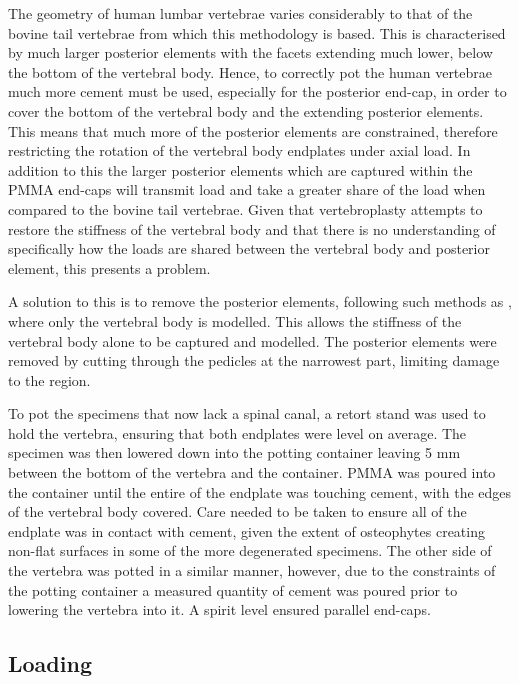 The geometry of human lumbar vertebrae varies considerably to that of the bovine
tail vertebrae from which this methodology is based. This is characterised by
much larger posterior elements with the facets extending much lower, below the
bottom of the vertebral body. Hence, to correctly pot the human vertebrae much
more cement must be used, especially for the posterior end-cap, in order to
cover the bottom of the vertebral body and the extending posterior elements.
This means that much more of the posterior elements are constrained, therefore
restricting the rotation of the vertebral body endplates under axial load. In
addition to this the larger posterior elements which are captured within the
PMMA end-caps will transmit load and take a greater share of the load when
compared to the bovine tail vertebrae. Given that vertebroplasty attempts to
restore the stiffness of the vertebral body and that there is no understanding
of specifically how the loads are shared between the vertebral body and
posterior element, this presents a problem.

A solution to this is to remove the posterior elements, following such methods
as \cite{Wijayathunga2008,RobsonBrown2014}, where only the vertebral body is
modelled. This allows the stiffness of the vertebral body alone to be captured
and modelled. The posterior elements were removed by cutting through the
pedicles at the narrowest part, limiting damage to the region.

To pot the specimens that now lack a spinal canal, a retort stand was used to
hold the vertebra, ensuring that both endplates were level on average. The
specimen was then lowered down into the potting container leaving 5 mm between
the bottom of the vertebra and the container. PMMA was poured into the container
until the entire of the endplate was touching cement, with the edges of the
vertebral body covered. Care needed to be taken to ensure all of the endplate
was in contact with cement, given the extent of osteophytes creating non-flat
surfaces in some of the more degenerated specimens. The other side of the
vertebra was potted in a similar manner, however, due to the constraints of the
potting container a measured quantity of cement was poured prior to lowering the
vertebra into it. A spirit level ensured parallel end-caps.

\subsection{Loading}

